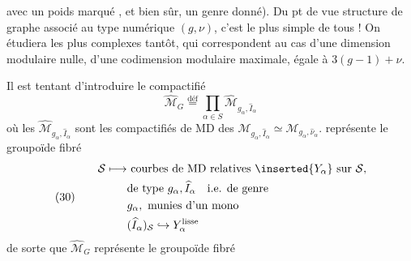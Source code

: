 avec un poids marqué \deleted{$\unsure{\nu}$}, \unsure{(}et bien sûr, un genre donné). Du pt de vue structure de graphe associé au type numérique $(g,\nu)$, c'est le plus simple de tous ! On étudiera les plus complexes tantôt, qui correspondent au cas d'une dimension modulaire nulle,  d'une codimension modulaire maximale, égale à $3(g-1)+\nu$.

Il est tentant d'introduire le compactifié
\[
\widehat{\mathcal M}_G\overset{\mathrm{déf}}{=}\prod_{\alpha\in S}\widehat{\mathcal M}_{g_\alpha,\widehat I_\alpha}
\]
où les $\widehat{\mathcal M}_{g_\alpha,\widehat I_\alpha}$ sont les compactifiés de MD des $\mathcal M_{g_\alpha,\widehat I_\alpha}\simeq\mathcal M_{g_\alpha,\widehat\nu_\alpha}$.  représente le groupoïde fibré
\[
(30)\qquad\begin{aligned}
\mathcal S\longmapsto&\ \text{courbes de MD relatives }\inserted{Y_\alpha}\text{ sur }\mathcal S,\\
&\text{de type }g_\alpha,\widehat I_\alpha\quad\text{i.e. de genre}\\
&g_\alpha,\text{ munies d'un mono}\\
&(\widehat I_\alpha)_{\mathcal S}\hookrightarrow Y_\alpha^{\text{lisse}}
\end{aligned}
\]
de sorte que $\widehat{\mathcal M}_G$ représente le groupoïde fibré

